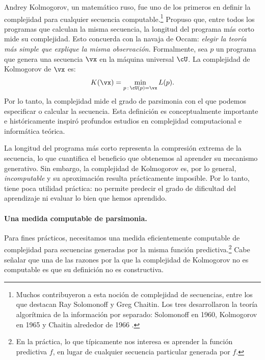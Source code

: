 \documentclass[../../book-main_es.tex]{subfiles}
\begin{document}
Andrey Kolmogorov, un matemático ruso, fue uno de los primeros en 
definir la complejidad para cualquier secuencia computable.\footnote{Muchos
    contribuyeron a esta noción de complejidad de secuencias, entre los que destacan Ray
    Solomonoff y Greg Chaitin. Los tres desarrollaron la teoría algorítmica
    de la información por separado: Solomonoff en 1960, Kolmogorov en
    1965 \cite{Kolmogorov1998OnTO} y Chaitin alrededor de 1966
\cite{Chaitin-1966}.} Propuso que, entre todos los programas que calculan
la misma secuencia, la longitud del programa más corto mide su
complejidad. Esto concuerda con la navaja de Occam: \textit{elegir la
teoría más simple que explique la misma observación}. Formalmente, sea \(p\)
un programa que genera una secuencia \(\vx\) en la máquina universal \(\cU\).
La complejidad de Kolmogorov de \(\vx\) es:
\begin{equation}
    K(\vx) = \min_{p\,:\, \cU(p) = \vx} L(p).
\end{equation}
Por lo tanto, la complejidad mide el grado de parsimonia con el que podemos especificar o
calcular la secuencia. Esta definición es conceptualmente importante e
históricamente inspiró profundos estudios en complejidad computacional
e informática teórica.

La longitud del programa más corto representa la compresión extrema de
la secuencia, lo que cuantifica el beneficio que obtenemos al aprender 
su mecanismo generativo. Sin embargo, la complejidad de Kolmogorov es, por lo general, {\em
incomputable} \cite{Cover-Thomas} y su aproximación resulta prácticamente imposible.
Por lo tanto, tiene poca utilidad práctica: no permite predecir
el grado de dificultad del aprendizaje ni evaluar lo bien que hemos aprendido.

\paragraph{Una medida computable de parsimonia.}
Para fines prácticos, necesitamos una medida eficientemente computable
de complejidad para secuencias generadas por la misma función predictiva.\footnote{En 
la práctica, lo que típicamente nos interesa es aprender la función predictiva \(f\),
    en lugar de cualquier secuencia particular generada por \(f\).} Cabe señalar que 
una de las razones por la que la complejidad de Kolmogorov no es computable 
es que su definición no es constructiva.
\end{document}
